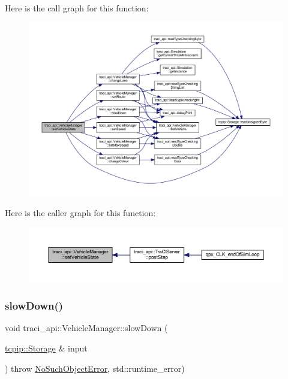 Here is the call graph for this function\+:\nopagebreak
\begin{figure}[H]
\begin{center}
\leavevmode
\includegraphics[width=350pt]{classtraci__api_1_1_vehicle_manager_a7b3c7300d7b091527ed296652701c471_cgraph}
\end{center}
\end{figure}
Here is the caller graph for this function\+:\nopagebreak
\begin{figure}[H]
\begin{center}
\leavevmode
\includegraphics[width=350pt]{classtraci__api_1_1_vehicle_manager_a7b3c7300d7b091527ed296652701c471_icgraph}
\end{center}
\end{figure}
\mbox{\label{classtraci__api_1_1_vehicle_manager_afaa8625978e32aab7ca85cd52ce450a8}} 
\subsubsection{\texorpdfstring{slow\+Down()}{slowDown()}}
{\footnotesize\ttfamily void traci\+\_\+api\+::\+Vehicle\+Manager\+::slow\+Down (\begin{DoxyParamCaption}\item[{\hyperlink{classtcpip_1_1_storage}{tcpip\+::\+Storage} \&}]{input }\end{DoxyParamCaption}) throw  \hyperlink{classtraci__api_1_1_no_such_object_error}{No\+Such\+Object\+Error}, std\+::runtime\+\_\+error) }

